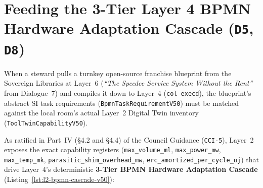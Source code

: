 \section{Feeding the 3-Tier Layer 4 BPMN Hardware Adaptation Cascade (\texttt{D5}, \texttt{D8})}
\label{sec:l2-bpmn-adaptation-cascade}

When a steward pulls a turnkey open-source franchise blueprint from the Sovereign Libraries at Layer~6 (\textit{``The Speedee Service System Without the Rent''} from Dialogue~7) and compiles it down to Layer~4 (\texttt{col-execd}), the blueprint's abstract SI task requirements (\texttt{BpmnTaskRequirementV50}) must be matched against the local room's actual Layer~2 Digital Twin inventory (\texttt{ToolTwinCapabilityV50}).

As ratified in Part~IV (\S4.2 and \S4.4) of the Council Guidance (\texttt{CCI-5}), Layer~2 exposes the exact capability registers (\texttt{max\_volume\_ml}, \texttt{max\_power\_mw}, \texttt{max\_temp\_mk}, \texttt{parasitic\_shim\_overhead\_mw}, \texttt{erc\_amortized\_per\_cycle\_uj}) that drive Layer~4's deterministic \textbf{3-Tier BPMN Hardware Adaptation Cascade} (Listing~\ref{lst:l2-bpmn-cascade-v50}):
